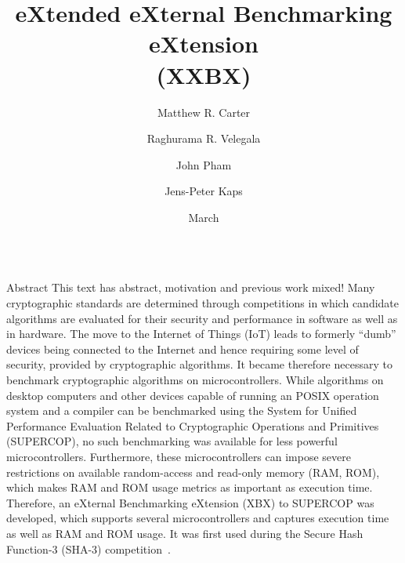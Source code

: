 \documentclass[xcolor=pdftex,dvipsnames,table,final]{beamer}
\title{\LARGE eXtended eXternal Benchmarking eXtension\\ \vspace{0.5ex}(XXBX)}
\author{Matthew R. Carter \and Raghurama R. Velegala \and John Pham \and Jens-Peter Kaps}%
\institute{\vspace{-1ex}Department of Electrical and Computer Engineering, George Mason University, Fairfax, Virginia 22030, USA }
\date{March}
\begin{document}
\begin{frame}[fragile]{} 
  \begin{columns}[t, totalwidth=\textwidth]
    \begin{column}{.31\linewidth}

      \begin{block}{Abstract}
This text has abstract, motivation and previous work mixed!
Many cryptographic standards are determined through competitions in which 
candidate algorithms are evaluated for their security and performance in software as
well as in hardware. The move to the Internet of Things (IoT) leads to formerly 
``dumb'' devices being connected to the Internet and hence requiring some level
of security, provided by cryptographic algorithms. It became therefore necessary
to benchmark cryptographic algorithms on microcontrollers. While algorithms on 
desktop computers and other devices capable of running an POSIX operation system and 
a compiler can be benchmarked using the 
System for Unified Performance Evaluation Related to Cryptographic Operations and Primitives
(SUPERCOP), no such benchmarking was available for less powerful microcontrollers. 
Furthermore,  these microcontrollers can impose severe restrictions on available 
random-access and read-only memory (RAM, ROM), which makes RAM and ROM usage metrics as
important as execution time.
Therefore, an eXternal Benchmarking eXtension (XBX) to SUPERCOP was developed, which 
supports several microcontrollers and captures execution time as well as RAM and ROM usage. 
It was first used during the Secure Hash Function-3 (SHA-3) competition~\cite{WGPK12}.  

      \end{block}


\end{column}
\end{columns}
\end{frame}
\end{document}
